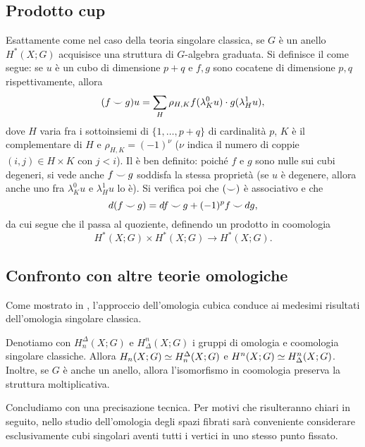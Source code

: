 \subsection{Prodotto cup}\label{cubic-homology:cup-product}
Esattamente come nel caso della teoria singolare classica, se \(G\) è un anello \(H^*(X;G)\) acquisisce una struttura di \(G\)-algebra graduata. Si definisce il \cupproduct{} come segue: se \(u\) è un cubo di dimensione \(p+q\) e \(f,g\) sono cocatene di dimensione \(p,q\) rispettivamente, allora
\[
(f\mathbin{\smile} g)u=\sum_H\rho_{H,K}f(\lambda^0_Ku)\cdot g(\lambda^1_Hu),
\]
dove \(H\) varia fra i sottoinsiemi di \(\{1,\ldots,p+q\}\) di cardinalità \(p\), \(K\) è il complementare di \(H\) e \(\rho_{H,K}=(-1)^\nu\) (\(\nu\) indica il numero di coppie \((i,j)\in H\times K\) con \(j<i\)). Il \cupproduct{} è ben definito: poiché \(f\) e \(g\) sono nulle sui cubi degeneri, si vede anche \(f\mathbin{\smile} g\) soddisfa la stessa proprietà (se \(u\) è degenere, allora anche uno fra \(\lambda^0_Ku\) e \(\lambda^1_Hu\) lo è). Si verifica poi che \((\mathbin{\smile})\) è associativo e che
\[
d(f\mathbin{\smile} g)=df\mathbin{\smile} g+(-1)^pf\mathbin{\smile} dg,
\]
da cui segue che il \cupproduct{} passa al quoziente, definendo un prodotto in coomologia 
\[
H^*(X;G)\times H^*(X;G)\longrightarrow H^*(X;G).
\]

\subsection{Confronto con altre teorie omologiche}\label{cubic-homology:comparison}
Come mostrato in , l'approccio dell'omologia cubica conduce ai medesimi risultati dell'omologia singolare classica.

\begin{theorem}
Denotiamo con \(H_n^\Delta(X;G)\) e \(H^n_\Delta(X;G)\) i gruppi di omologia e coomologia singolare classiche. Allora \(H_n(X;G)\simeq H_n^\Delta(X;G)\) e \(H^n(X;G)\simeq H_\Delta^n(X;G)\). Inoltre, se \(G\) è anche un anello, allora l'isomorfismo in coomologia preserva la struttura moltiplicativa.
\end{theorem}

Concludiamo con una precisazione tecnica. Per motivi che risulteranno chiari in seguito, nello studio dell'omologia degli spazi fibrati sarà conveniente considerare esclusivamente cubi singolari aventi tutti i vertici in uno stesso punto fissato.

